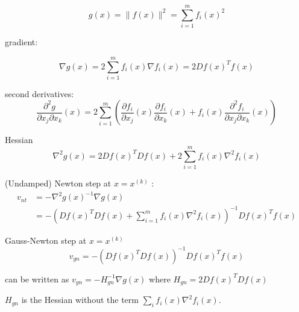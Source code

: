 \begin{equation}
g(x)=\|f(x)\|^{2}=\sum_{i=1}^{m} f_{i}(x)^{2}
\end{equation}

\begin{theorem}
   gradient:

\begin{equation}
\nabla g(x)=2 \sum_{i=1}^{m} f_{i}(x) \nabla f_{i}(x)=2 D f(x)^{T} f(x)
\end{equation} 
\end{theorem}

\begin{theorem}
    second derivatives:
\begin{equation}
\frac{\partial^{2} g}{\partial x_{j} \partial x_{k}}(x)=2 \sum_{i=1}^{m}\left(\frac{\partial f_{i}}{\partial x_{j}}(x) \frac{\partial f_{i}}{\partial x_{k}}(x)+f_{i}(x) \frac{\partial^{2} f_{i}}{\partial x_{j} \partial x_{k}}(x)\right)
\end{equation}
\end{theorem}

\begin{theorem}
    Hessian
\begin{equation}
\nabla^{2} g(x)=2 D f(x)^{T} D f(x)+2 \sum_{i=1}^{m} f_{i}(x) \nabla^{2} f_{i}(x)
\end{equation}
\end{theorem}

\begin{theorem}
    (Undamped) Newton step at $ x=x^{(k)} $ :
\begin{equation}
\begin{aligned}
v_{{nt}} &=-\nabla^{2} g(x)^{-1} \nabla g(x) \\
&=-\left(D f(x)^{T} D f(x)+\sum_{i=1}^{m} f_{i}(x) \nabla^{2} f_{i}(x)\right)^{-1} D f(x)^{T} f(x)
\end{aligned}
\end{equation}

\end{theorem}

\begin{theorem}
    Gauss-Newton step at $ x=x^{(k)} $
\begin{equation}
v_{{gn}}=-\left(D f(x)^{T} D f(x)\right)^{-1} D f(x)^{T} f(x)
\end{equation}
\end{theorem}

\begin{corollary}
    can be written as $ v_{{gn}}=-H_{{gn}}^{-1} \nabla g(x) $ where $ H_{{gn}}=2 D f(x)^{T} D f(x) $

    $ H_{{gn}} $ is the Hessian without the term $ \sum_{i} f_{i}(x) \nabla^{2} f_{i}(x) $.
\end{corollary}





